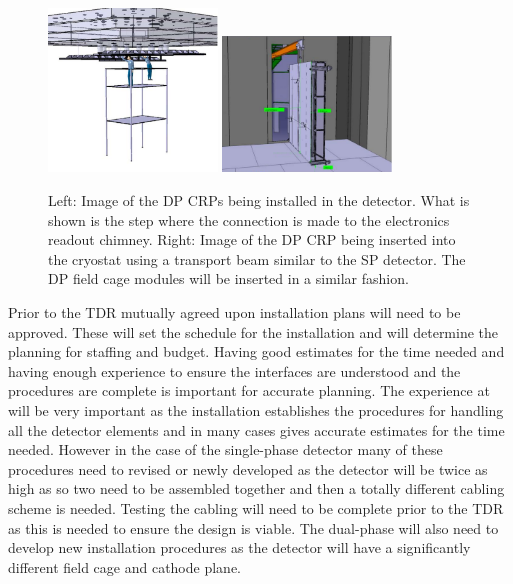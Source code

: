 \begin{figure}[htbp]
\begin{center}
\includegraphics[width=0.4\textwidth]{far-detector-single-phase/figures/CRP-install.pdf}
\includegraphics[width=0.4\textwidth]{far-detector-single-phase/figures/CRP-into-cryostat.pdf}
\caption{Left: Image of the DP CRPs being installed in the detector. What is shown is the step where the connection is made to the electronics readout chimney. Right: Image of the DP CRP being inserted into the cryostat using a transport beam similar to the SP detector. The DP field cage modules will be inserted in a similar fashion.}
\label{fig:CRP-Install}
\end{center}
\end{figure}



Prior to the TDR mutually agreed upon installation plans will need to
be approved. These will set the schedule for the installation and will
determine the planning for staffing and budget. Having good estimates
for the time needed and having enough experience to ensure the
interfaces are understood and the procedures are complete is important
for accurate planning. The experience at  will be
very important as the  installation establishes the
procedures for handling all the detector elements and in many cases
gives accurate estimates for the time needed. However in the case of
the single-phase detector many of these procedures need to revised or
newly developed as the  detector will be twice as high as
 so two  need to be assembled together
and then a totally different cabling scheme is needed. Testing the
cabling will need to be complete prior to the TDR as this is needed to
ensure the design is viable. The dual-phase will also need to develop
new installation procedures as the   detector
will have a significantly different field cage and cathode plane. 

